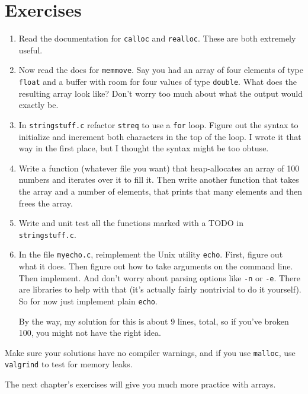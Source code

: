 \documentclass[ebook,11pt,oneside,openany]{memoir}
\newcommand{\cf}[1]{\texttt{#1}}
\begin{document}
\section{Exercises}
\begin{enumerate}
\item Read the documentation for \texttt{calloc} and \texttt{realloc}. These are both extremely useful.

\item Now read the docs for \cf{memmove}. Say you had an array of four elements of type \cf{float} and a buffer with room for four values of type \cf{double}. What does the resulting array look like? Don't worry too much about what the output would exactly be. 

\item In \texttt{stringstuff.c} refactor \texttt{streq} to use a \texttt{for} loop. Figure out the syntax to initialize and increment both characters in the top of the loop. I wrote it that way in the first place, but I thought the syntax might be too obtuse.

\item Write a function (whatever file you want) that heap-allocates an array of 100 numbers and iterates over it to fill it. Then write another function that takes the array and a number of elements, that prints that many elements and then frees the array.

\item Write and unit test all the functions marked with a TODO in \texttt{stringstuff.c}.

\item In the file \cf{myecho.c}, reimplement the Unix utility \cf{echo}. First, figure out what it does. Then figure out how to take arguments on the command line. Then implement. And don't worry about parsing options like \cf{-n} or \cf{-e}. There are libraries to help with that (it's actually fairly nontrivial to do it yourself). So for now just implement plain \cf{echo}.

By the way, my solution for this is about 9 lines, total, so if you've broken 100, you might not have the right idea.

\end{enumerate}

Make sure your solutions have no compiler warnings, and if you use \cf{malloc}, use \cf{valgrind} to test for memory leaks.

The next chapter's exercises will give you much more practice with arrays.
\end{document}

